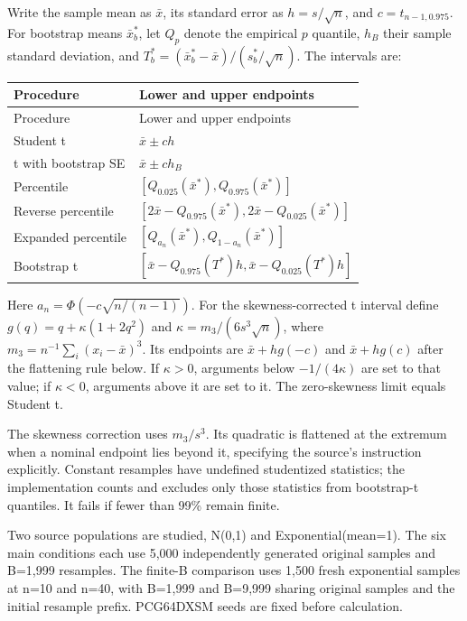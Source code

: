 Write the sample mean as $\bar x$, its standard error as $h=s/\sqrt n$, and $c=t_{n-1,0.975}$. For bootstrap means $\bar x_b^*$, let $Q_p$ denote the empirical $p$ quantile, $h_B$ their sample standard deviation, and $T_b^*=(\bar x_b^*-\bar x)/(s_b^*/\sqrt n)$. The intervals are:

{\small\setlength{\tabcolsep}{3pt}
\begin{longtable}{@{}p{.23\linewidth}p{.72\linewidth}@{}}
\toprule

Procedure & Lower and upper endpoints \\
\midrule
\endfirsthead
\toprule
Procedure & Lower and upper endpoints \\
\midrule
\endhead

Student t & $\bar x\pm ch$ \\

t with bootstrap SE & $\bar x\pm ch_B$ \\

Percentile & $[Q_{0.025}(\bar x^*), Q_{0.975}(\bar x^*)]$ \\

Reverse percentile & $[2\bar x-Q_{0.975}(\bar x^*), 2\bar x-Q_{0.025}(\bar x^*)]$ \\

Expanded percentile & $[Q_{a_n}(\bar x^*), Q_{1-a_n}(\bar x^*)]$ \\

Bootstrap t & $[\bar x-Q_{0.975}(T^*)h,\bar x-Q_{0.025}(T^*)h]$ \\

\bottomrule
\end{longtable}
}

Here $a_n=\Phi(-c\sqrt{n/(n-1)})$. For the skewness-corrected t interval define $g(q)=q+\kappa(1+2q^2)$ and $\kappa=m_3/(6s^3\sqrt n)$, where $m_3=n^{-1}\sum_i(x_i-\bar x)^3$. Its endpoints are $\bar x+h g(-c)$ and $\bar x+h g(c)$ after the flattening rule below. If $\kappa>0$, arguments below $-1/(4\kappa)$ are set to that value; if $\kappa<0$, arguments above it are set to it. The zero-skewness limit equals Student t.

The skewness correction uses $m_3/s^3$. Its quadratic is flattened at the extremum when a nominal endpoint lies beyond it, specifying the source's instruction explicitly. Constant resamples have undefined studentized statistics; the implementation counts and excludes only those statistics from bootstrap-t quantiles. It fails if fewer than 99\% remain finite.

Two source populations are studied, N(0,1) and Exponential(mean=1). The six main conditions each use 5,000 independently generated original samples and B=1,999 resamples. The finite-B comparison uses 1,500 fresh exponential samples at n=10 and n=40, with B=1,999 and B=9,999 sharing original samples and the initial resample prefix. PCG64DXSM seeds are fixed before calculation.


